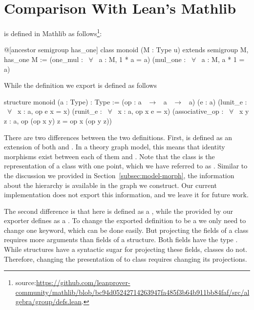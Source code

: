 
\section{Comparison With Lean's Mathlib}
 is defined in Mathlib as follows\footnote{source:\url{https://github.com/leanprover-community/mathlib/blob/bc94d05242714263947fa485f3b64b911bb84faf/src/algebra/group/defs.lean}.}: 
\begin{leancode} 
@[ancestor semigroup has_one]
class monoid (M : Type u) extends semigroup M, has_one M :=
  (one_mul : ~$\forall$~ a : M, 1 * a = a) (mul_one : ~$\forall$~ a : M, a * 1 = a)
\end{leancode} 
While the definition we export is defined as follows 
\begin{leancode} 
structure monoid (a : Type) : Type := 
  (op : a ~$\to$~ a ~$\to$~ a)
  (e  : a)
  (lunit_e : ~$\forall$~ {x : a}, op e x = x)
  (runit_e : ~$\forall$~ {x : a}, op x e = x)
  (associative_op : ~$\forall$~ {x y z : a}, op (op x y) z = op x (op y z)) 
\end{leancode} 
There are two differences between the two definitions. First,  is defined as an extension of both  and . In a theory graph model, this means that identity morphisms exist between each of them and . Note that the  class is the representation of a class with one point, which we have referred to as . 
Similar to the discussion we provided in Section~\ref{subsec:model-morph}, the information about the hierarchy is available in the graph we construct. Our current implementation does not export this information, and we leave it for future work. 

The second difference is that  here is defined as a , while the  provided by our exporter defines  as a . To change the exported definition to be a  we only need to change one keyword, which can be done easily. But projecting the fields of a class requires more arguments than fields of a structure. Both fields have the type 
. While structures have a syntactic sugar for projecting these fields, classes do not. Therefore, changing the presentation of  to class requires changing its projections. 

